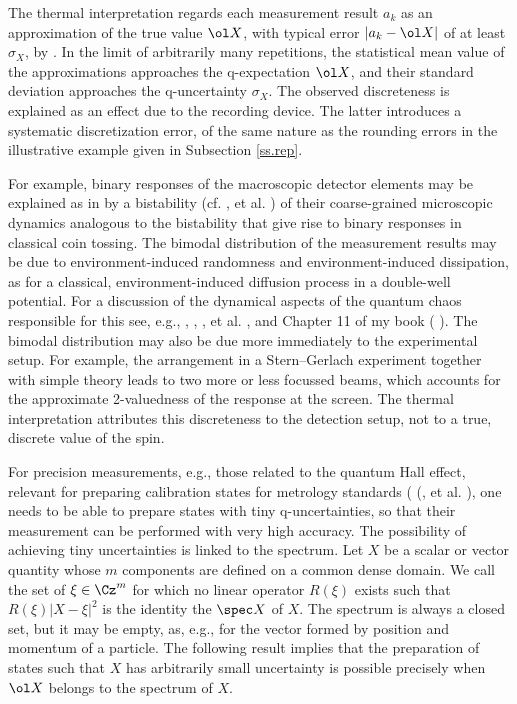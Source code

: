\documentclass[12pt]{article}
\begin{document}
The thermal interpretation regards each measurement result $a_k$ as an 
approximation of the true value $\ol X$, with typical error 
$|a_k-\ol X|$ of at least $\sigma_X$, by . In the limit 
of arbitrarily many repetitions,
the statistical mean value of the approximations approaches the 
q-expectation $\ol X$, and their standard deviation approaches the
q-uncertainty $\sigma_X$. The observed discreteness is explained as an 
effect due to the recording device. The latter introduces a systematic
discretization error, of the same nature as the rounding errors in the 
illustrative example given in Subsection \ref{ss.rep}.

For example, binary responses of the macroscopic detector elements may 
be explained as in  \cite[Chapter 11]{Neu.CQP} by a 
bistability (cf.  \cite{BonL}, 
 et al. \cite{GevSCK}) of their coarse-grained 
microscopic dynamics analogous to the bistability that give rise to 
binary responses in classical coin tossing. 
The bimodal distribution of the measurement results may be due 
to environment-induced randomness and environment-induced dissipation, 
as for a classical, environment-induced diffusion process in a 
double-well potential. For a discussion of the dynamical aspects of 
the quantum chaos responsible for this see, e.g., 
 \cite{IngA},
 \cite{ZhaF},
 \cite{BelE},
 et al. \cite{GomLL}, 
and Chapter 11 of  my book ( \cite{Neu.CQP}).
The bimodal distribution may also be due more immediately to the 
experimental setup. For example, the arrangement in a Stern--Gerlach 
experiment together with simple theory leads to two more or less 
focussed beams, which accounts for the approximate 2-valuedness of the 
response at the screen. The thermal interpretation attributes this 
discreteness to the detection setup, not to a true, discrete value of 
the spin.

For precision measurements, e.g., those related to the quantum Hall 
effect, relevant for preparing calibration states for metrology 
standards ( (\cite{Lin},  et al. 
\cite{KanNO}), one needs to be able to prepare states with tiny 
q-uncertainties, so that their measurement can be performed with very 
high accuracy. The possibility of achieving tiny uncertainties is 
linked to the spectrum. Let $X$ be a scalar or vector quantity whose
$m$ components are defined on a common dense domain.
We call the set of $\xi\in\Cz^m$ for which no linear operator $R(\xi)$ 
exists such that $R(\xi)|X-\xi|^2$ is the identity the  
$\spec X$ of $X$. The spectrum
is always a closed set, but it may be empty, as, e.g., for the vector
formed by position and momentum of a particle. The following result 
implies that the preparation of states such that $X$ has arbitrarily 
small uncertainty is possible precisely when $\ol X$ belongs to the 
spectrum of $X$. 
\end{document}
